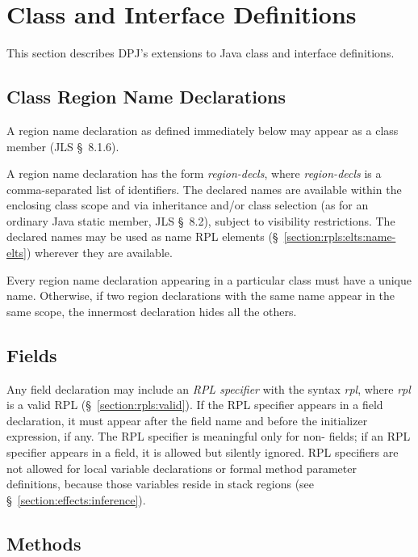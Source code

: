 \section{Class and Interface Definitions}
\label{section:class-def}

This section describes DPJ's extensions to Java class and interface
definitions.

\subsection{Class Region Name Declarations}
\label{section:class-def:class-rgn-decl}

A region name declaration as defined immediately below may appear as a
class member (JLS \S~8.1.6).

A region name declaration has the form 
\emph{region-decls}, where \emph{region-decls} is a comma-separated
list of identifiers.  The declared names are available within the
enclosing class scope and via inheritance and/or class selection (as
for an ordinary Java static member, JLS \S~8.2), subject to visibility
restrictions.  The declared names may be used as name RPL elements
(\S~\ref{section:rpls:elts:name-elts}) wherever they are available.

Every region name declaration appearing in a particular class must
have a unique name.  Otherwise, if two region declarations with the
same name appear in the same scope, the innermost declaration hides
all the others.

\subsection{Fields}
\label{section:class-def:fields}

Any field declaration may include an \emph{RPL specifier} with the
syntax  \emph{rpl}, where \emph{rpl} is a valid RPL
(\S~\ref{section:rpls:valid}). If the RPL specifier appears in a field
declaration, it must appear after the field name and before the
initializer expression, if any.  The RPL specifier is meaningful only
for non- fields; if an RPL specifier appears in a
 field, it is allowed but silently ignored.  RPL specifiers
are not allowed for local variable declarations or formal method
parameter definitions, because those variables reside in stack regions
(see \S~\ref{section:effects:inference}).


\subsection{Methods}
\label{section:class-def:methods}

